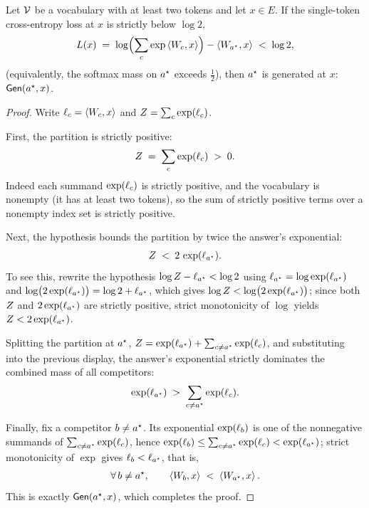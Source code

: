 \begin{lemma}
\label{lem:loss_below_log2_decodes}
Let $\mathcal{V}$ be a vocabulary with at least two tokens and let $x \in E$. If the single-token
cross-entropy loss at $x$ is strictly below $\log 2$,
\begin{align*}
L(x) \;=\; \log\Bigl(\sum_{c} \exp\left\langle W_c, x \right\rangle\Bigr) - \left\langle W_{a^{\star}}, x \right\rangle \;<\; \log 2,
\end{align*}
(equivalently, the softmax mass on $a^{\star}$ exceeds $\tfrac12$), then $a^{\star}$ is generated at
$x$: $\mathsf{Gen}(a^{\star}, x)$.
\end{lemma}

\begin{proof}
Write $\ell_{c} = \left\langle W_c, x \right\rangle$ and $Z = \sum_{c}\exp(\ell_{c})$.

First, the partition is strictly positive:
\begin{align*}
Z \;=\; \sum_{c} \exp(\ell_{c}) \;>\; 0.
\end{align*}
Indeed each summand $\exp(\ell_{c})$ is strictly positive, and the vocabulary is nonempty (it
has at least two tokens), so the sum of strictly positive terms over a nonempty index set is
strictly positive.

Next, the hypothesis bounds the partition by twice the answer's exponential:
\begin{align*}
Z \;<\; 2\,\exp(\ell_{a^{\star}}).
\end{align*}
To see this, rewrite the hypothesis $\log Z - \ell_{a^{\star}} < \log 2$ using
$\ell_{a^{\star}} = \log\exp(\ell_{a^{\star}})$ and $\log\bigl(2\exp(\ell_{a^{\star}})\bigr) = \log 2 + \ell_{a^{\star}}$,
which gives $\log Z < \log\bigl(2\exp(\ell_{a^{\star}})\bigr)$; since both $Z$ and
$2\exp(\ell_{a^{\star}})$ are strictly positive, strict monotonicity of $\log$ yields
$Z < 2\exp(\ell_{a^{\star}})$.

Splitting the partition at $a^{\star}$, $Z = \exp(\ell_{a^{\star}}) + \sum_{c \ne a^{\star}}\exp(\ell_{c})$,
and substituting into the previous display, the answer's exponential strictly dominates the
combined mass of all competitors:
\begin{align*}
\exp(\ell_{a^{\star}}) \;>\; \sum_{c \ne a^{\star}} \exp(\ell_{c}).
\end{align*}

Finally, fix a competitor $b \ne a^{\star}$. Its exponential $\exp(\ell_{b})$ is one of the
nonnegative summands of $\sum_{c \ne a^{\star}}\exp(\ell_{c})$, hence
$\exp(\ell_{b}) \le \sum_{c \ne a^{\star}}\exp(\ell_{c}) < \exp(\ell_{a^{\star}})$; strict
monotonicity of $\exp$ gives $\ell_{b} < \ell_{a^{\star}}$, that is,
\begin{align*}
\forall\, b \ne a^{\star},\qquad \left\langle W_b, x \right\rangle \;<\; \left\langle W_{a^{\star}}, x \right\rangle.
\end{align*}
This is exactly $\mathsf{Gen}(a^{\star}, x)$, which completes the proof.
\end{proof}

